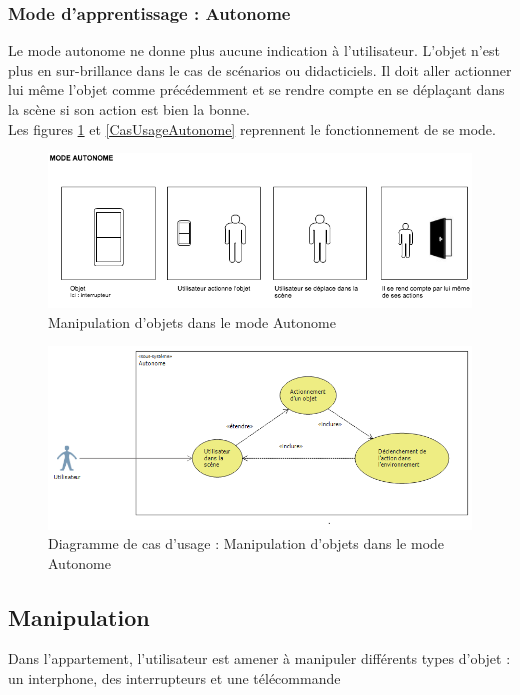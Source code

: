 \subsubsection{Mode d'apprentissage : Autonome}

Le mode autonome ne donne plus aucune indication à l'utilisateur. L'objet n'est plus en sur-brillance dans le cas de scénarios ou didacticiels. Il doit aller actionner lui même l'objet comme précédemment et se rendre compte en se déplaçant dans la scène si son action est bien la bonne. 
\\
Les figures \ref{fig:MaquetteAutonome} et \ref{CasUsageAutonome}  reprennent le fonctionnement de se mode.

\begin{figure}[h]
\centering
\includegraphics[width=1\textwidth]{2-Specifications/img-utilisateur/autonome.png}
\caption{\label{fig:MaquetteAutonome} Manipulation d'objets dans le mode Autonome }
\end{figure}
\begin{figure}[h]
\centering
\includegraphics[width=1\textwidth]{2-Specifications/img-utilisateur/cas-usage-autonome.png}
\caption{\label{fig:CasUsageAutonome} Diagramme de cas d'usage : Manipulation d'objets dans le mode Autonome }
\end{figure}
\FloatBarrier 



\subsection{Manipulation}
Dans l’appartement, l’utilisateur est amener à manipuler différents types d’objet : un interphone, des interrupteurs et une télécommande

